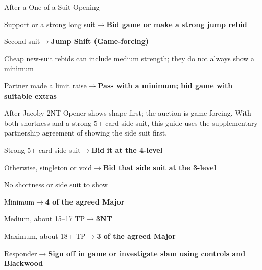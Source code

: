 \documentclass[10pt,letterpaper]{article}
\begin{document}
\begin{minipage}[t]{0.485\textwidth}
\begin{guidecard}{After a One-of-a-Suit Opening}
\begin{branches}
\begin{branches}
\item Support or a strong long suit\;\ensuremath{\longrightarrow}\;\textbf{Bid game or make a strong jump rebid}
\item Second suit\;\ensuremath{\longrightarrow}\;\textbf{Jump Shift (Game-forcing)}
\end{branches}
\item Cheap new-suit rebids can include medium strength; they do not always show a minimum
\item Partner made a limit raise\;\ensuremath{\longrightarrow}\;\textbf{Pass with a minimum; bid game with suitable extras}
\end{branches}
\end{guidecard}

\begin{guidecard}{After Jacoby 2NT}
Opener shows shape first; the auction is game-forcing. With both shortness and a strong 5+ card side suit, this guide uses the supplementary partnership agreement of showing the side suit first.\par\smallskip
\begin{branches}
\item Strong 5+ card side suit\;\ensuremath{\longrightarrow}\;\textbf{Bid it at the 4-level}
\item Otherwise, singleton or void\;\ensuremath{\longrightarrow}\;\textbf{Bid that side suit at the 3-level}
\item No shortness or side suit to show
\begin{branches}
\item Minimum\;\ensuremath{\longrightarrow}\;\textbf{4 of the agreed Major}
\item Medium, about 15--17 TP\;\ensuremath{\longrightarrow}\;\textbf{3NT}
\item Maximum, about 18+ TP\;\ensuremath{\longrightarrow}\;\textbf{3 of the agreed Major}
\end{branches}
\item Responder\;\ensuremath{\longrightarrow}\;\textbf{Sign off in game or investigate slam using controls and Blackwood}
\end{branches}
\end{guidecard}

\end{minipage}\hfill
\end{document}
